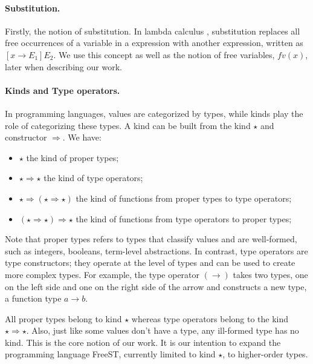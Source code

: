 \documentclass[sigplan]{acmart}
\begin{document}
\paragraph{Substitution.}
Firstly, the notion of substitution. In lambda calculus \cite{Church1936AnUP}, substitution replaces all free occurrences of a variable in a expression with another expression, written as $[x \rightarrow E_1]E_2$. We use this concept as well as the notion of free variables, $\mathit fv(x)$, later when describing our work.

\paragraph{Kinds and Type operators.}
In programming languages, values are categorized by types, while kinds play the role of categorizing these types. A kind can be built from the kind $\star$ and constructor $\Rightarrow$. We have:

\begin{itemize}
    \item $\star$ the kind of proper types;
    \item $\star\Rightarrow\star$ the kind of type operators;
    \item $\star\Rightarrow(\star\Rightarrow\star)$ the kind of functions from proper types to type operators;
    \item $(\star\Rightarrow\star)\Rightarrow\star$ the kind of functions from type operators to proper types;
\end{itemize}

Note that proper types refers to types that classify values and are well-formed, such as integers, booleans,  term-level abstractions. In contrast, type operators are type constructors; they operate at the level of types and can be used to create more complex types. For example, the type operator $(\rightarrow)$ takes two types, one on the left side and one on the right side of the arrow and constructs a new type, a function type $a \rightarrow b$.

All proper types belong to kind $\star$ whereas type operators belong to the kind $\star\Rightarrow\star$. Also, just like some values don't have a type, any ill-formed type has no kind.
This is the core notion of our work. It is our intention to expand the programming language FreeST, currently limited to kind $\star$, to higher-order types.
\end{document}

